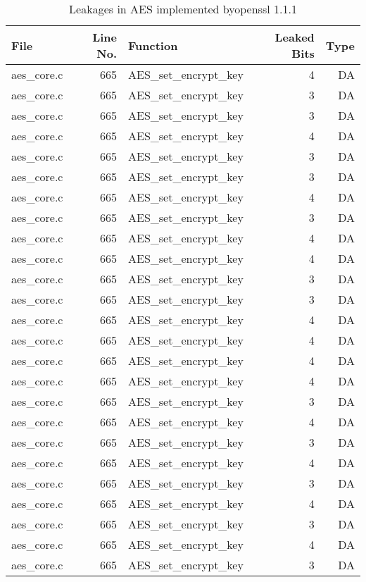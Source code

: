 \begin{table}%
\centering\tiny\scriptsize
\renewcommand{\baselinestretch}{0.96}\selectfont
\caption{Leakages in AES implemented byopenssl 1.1.1}\label{tab:AESopenssl1.1.1}
\begin{tabular}{lrlrr}
\hline
\textbf{File} & \textbf{Line No.} & \textbf{Function} & \textbf{Leaked Bits} & \textbf{Type} \\\hline
aes\_core.c& 665&AES\_set\_encrypt\_key&4 &DA\\
aes\_core.c& 665&AES\_set\_encrypt\_key&3 &DA\\
aes\_core.c& 665&AES\_set\_encrypt\_key&3 &DA\\
aes\_core.c& 665&AES\_set\_encrypt\_key&4 &DA\\
aes\_core.c& 665&AES\_set\_encrypt\_key&3 &DA\\
aes\_core.c& 665&AES\_set\_encrypt\_key&3 &DA\\
aes\_core.c& 665&AES\_set\_encrypt\_key&4 &DA\\
aes\_core.c& 665&AES\_set\_encrypt\_key&3 &DA\\
aes\_core.c& 665&AES\_set\_encrypt\_key&4 &DA\\
aes\_core.c& 665&AES\_set\_encrypt\_key&4 &DA\\
aes\_core.c& 665&AES\_set\_encrypt\_key&3 &DA\\
aes\_core.c& 665&AES\_set\_encrypt\_key&3 &DA\\
aes\_core.c& 665&AES\_set\_encrypt\_key&4 &DA\\
aes\_core.c& 665&AES\_set\_encrypt\_key&4 &DA\\
aes\_core.c& 665&AES\_set\_encrypt\_key&4 &DA\\
aes\_core.c& 665&AES\_set\_encrypt\_key&4 &DA\\
aes\_core.c& 665&AES\_set\_encrypt\_key&3 &DA\\
aes\_core.c& 665&AES\_set\_encrypt\_key&4 &DA\\
aes\_core.c& 665&AES\_set\_encrypt\_key&3 &DA\\
aes\_core.c& 665&AES\_set\_encrypt\_key&4 &DA\\
aes\_core.c& 665&AES\_set\_encrypt\_key&3 &DA\\
aes\_core.c& 665&AES\_set\_encrypt\_key&4 &DA\\
aes\_core.c& 665&AES\_set\_encrypt\_key&3 &DA\\
aes\_core.c& 665&AES\_set\_encrypt\_key&4 &DA\\
aes\_core.c& 665&AES\_set\_encrypt\_key&3 &DA\\

\end{tabular}
\end{table}
